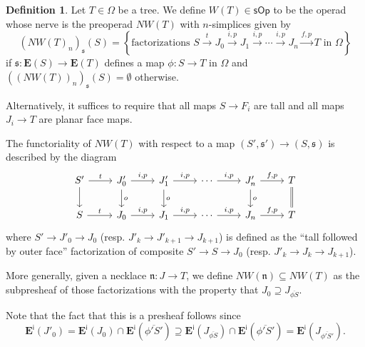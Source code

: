 \documentclass[a4paper,10pt
,draft
]{article}%
\numberwithin{equation}{section}
\numberwithin{figure}{section}
\theoremstyle{definition} %
\newtheorem{definition}[equation]{Definition}%
\newcommand{\1}{\ensuremath{\mathbbm 1}}%
\begin{document}
\begin{definition}\label{NWTNS DEF}
	Let $T \in \Omega$ be a tree.
	We define 
	$W(T) \in \mathsf{sOp}$
	to be the operad whose nerve is the preoperad
	$NW(T)$ with $n$-simplices given by
\[
	\left(NW(T)_n\right)_{\mathfrak{s}}(S)
=
	\left\{
	\text{factorizations }
	S \xrightarrow{t} 
	J_0 \xrightarrow{i,p} 
	J_1 \xrightarrow{i,p} 
	\cdots \xrightarrow{i,p}
	J_n \xrightarrow{f,p}
	T
	\text{ in $\Omega$}
	\right\}
\]
	if $\mathfrak{s} \colon \boldsymbol{E}(S) \to \boldsymbol{E}(T)$
	defines a map $\phi \colon S \to T$ in $\Omega$
	and
	$\left(\left(NW(T)\right)_n\right)_{\mathfrak{s}}(S) = \emptyset$
	otherwise.
	
	Alternatively, it suffices to require that all maps
	$S \to F_i$ are tall
	and all maps $J_i \to T$ are planar face maps.

	
	The functoriality of 
	$NW(T)$
	with respect to a map $(S', \mathfrak s') \to ({S},\mathfrak{s})$
	is described by the diagram
\[
\begin{tikzcd}
	S' \ar{r}{t} \ar{d}
&
	J'_0 \ar{r}{i,p} \ar{d}{o}
&
	J'_1 \ar{r}{i,p} \ar{d}{o}
&
	\cdots \ar{r}{i,p}
&
	J'_n \ar{r}{f,p} \ar{d}{o}
&
	T \ar[equal]{d}
\\
	S \ar{r}{t} 
&
	J_0 \ar{r}{i,p}
&
	J_1 \ar{r}{i,p}
&
	\cdots \ar{r}{i,p}
&
	J_n \ar{r}{f,p}
&
	T	
\end{tikzcd}
\]
	where 
	$S' \to J'_0 \to J_0$
	(resp. $J'_k \to J'_{k+1} \to J_{k+1}$)
	is defined as the ``tall followed by outer face''
	factorization of composite
	$S' \to S \to J_0$
	(resp. $J'_k \to J_{k} \to J_{k+1}$).

	More generally, 
	given a necklace $\mathfrak{n}\colon J \to T$,
	we define
	$NW(\mathfrak{n}) \subseteq NW(T)$
	as the subpresheaf
	of those factorizations with the property that
	$J_0 \supseteq J_{\overline{\phi S}}$.

	Note that the fact that this is a presheaf follows 
	since
\[
	\boldsymbol{E}^{\mathsf{i}}(J'_0)
=
	\boldsymbol{E}^{\mathsf{i}}(J_0)
	\cap
	\boldsymbol{E}^{\mathsf{i}}(\overline{\phi' S'})
\supseteq
	\boldsymbol{E}^{\mathsf{i}}(J_{\overline{\phi S}})
	\cap
	\boldsymbol{E}^{\mathsf{i}}(\overline{\phi' S'})
=
	\boldsymbol{E}^{\mathsf{i}}(J_{\overline{\phi' S'}}).
\]
\end{definition}
\end{document}
